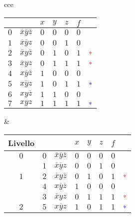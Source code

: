 \documentclass[a4paper]{extarticle}
\renewcommand\arraystretch{}
\begin{document}
\begin{table}[H]
    \setlength{\tabcolsep}{8pt}
    \renewcommand{\arraystretch}{1.2}
    \begin{tabularx}{\textwidth}{ccc}
    {
        \hspace{-1em}
        \setlength{\tabcolsep}{3.5pt}
        \begin{tabular}{c|c|ccc|cc}
             & & $x$ & $y$ & $z$ & $f$\\
             \hline
             $0$ & $\overline{x}\overline{y}\overline{z}$ & $0$ & $0$ & $0$ & $0$\\
             $1$ & $\overline{x}\overline{y}z$ & $0$ & $0$ & $1$ & $0$\\
             $2$ & $\overline{x}y\overline{z}$ & $0$ & $1$ & $0$ & $1$ & $\color{red}{\ast}$\\
             $3$ & $\overline{x}yz$ & $0$ & $1$ & $1$ & $1$ & $\color{red}{\ast}$\\
             $4$ & $x\overline{y}\overline{z}$ & $1$ & $0$ & $0$ & $0$\\
             $5$ & $x\overline{y}z$ & $1$ & $0$ & $1$ & $1$ & $\color{blue}{\ast}$\\
             $6$ & $xy\overline{z}$ & $1$ & $1$ & $0$ & $0$\\
             $7$ & $xyz$ & $1$ & $1$ & $1$ & $1$ & $\color{blue}{\ast}$\\
        \end{tabular}
    }
    &
    {
        \hspace{-1em}
        \setlength{\tabcolsep}{3.5pt}
        \begin{tabular}{c|c|c|ccc|cc}
             \textbf{Livello} & & & $x$ & $y$ & $z$ & $f$\\
             \hline
             $0$ & $0$ & $\overline{x}\overline{y}\overline{z}$ & $0$ & $0$ & $0$ & $0$\\
             \hline
              & $1$ & $\overline{x}\overline{y}z$ & $0$ & $0$ & $1$ & $0$\\
              \(1\) & $2$ & $\overline{x}y\overline{z}$ & $0$ & $1$ & $0$ & $1$ & $\color{red}{\ast}$\\
              & $4$ & $x\overline{y}\overline{z}$ & $1$ & $0$ & $0$ & $0$\\
             \hline
              &
             $3$ & $\overline{x}yz$ & $0$ & $1$ & $1$ & $1$ & $\color{red}{\ast}$\\
             \(2\) & $5$ & $x\overline{y}z$ & $1$ & $0$ & $1$ & $1$ & $\color{blue}{\ast}$\\

\end{tabular}}
\end{tabularx}
\end{table}
\end{document}
